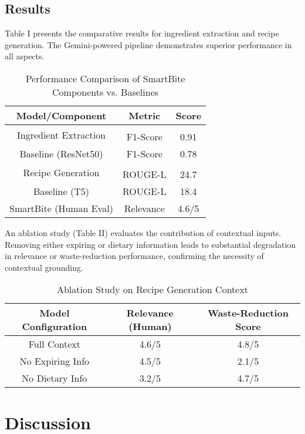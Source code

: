 \documentclass[conference]{IEEEtran}
\begin{document}
\subsection{Results}

Table I presents the comparative results for ingredient extraction and recipe generation. The Gemini-powered pipeline demonstrates superior performance in all aspects.

\begin{table}[h]
  \centering
  \caption{Performance Comparison of SmartBite Components vs. Baselines}
  \label{tab:results}
  \begin{tabular}{|c|c|c|}
    \hline
    \textbf{Model/Component} & \textbf{Metric} & \textbf{Score} \\
    \hline
    \multirow{2}{*}{Ingredient Extraction} & & \\
    & F1-Score & 0.91 \\
    Baseline (ResNet50) & F1-Score & 0.78 \\
    \hline
    \multirow{2}{*}{Recipe Generation} & & \\
    & ROUGE-L & 24.7 \\
    Baseline (T5) & ROUGE-L & 18.4 \\
    SmartBite (Human Eval) & Relevance & 4.6/5 \\
    \hline
  \end{tabular}
\end{table}

An ablation study (Table II) evaluates the contribution of contextual inputs. Removing either expiring or dietary information leads to substantial degradation in relevance or waste-reduction performance, confirming the necessity of contextual grounding.

\begin{table}[h]
  \centering
  \caption{Ablation Study on Recipe Generation Context}
  \label{tab:ablation}
  \begin{tabular}{|c|c|c|}
    \hline
    \textbf{Model Configuration} & \textbf{Relevance (Human)} & \textbf{Waste-Reduction Score} \\
    \hline
    Full Context & 4.6/5 & 4.8/5 \\
    No Expiring Info & 4.5/5 & 2.1/5 \\
    No Dietary Info & 3.2/5 & 4.7/5 \\
    \hline
  \end{tabular}
\end{table}

\section{Discussion}
\end{document}
